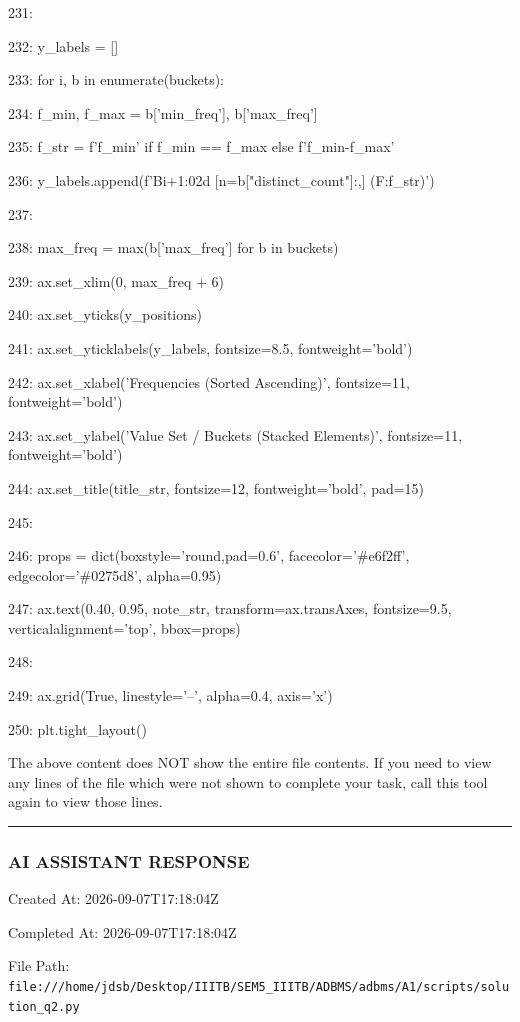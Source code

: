 \documentclass[11pt,a4paper]{article}
\begin{document}
231:

232:     y\_labels = []

233:     for i, b in enumerate(buckets):

234:         f\_min, f\_max = b['min\_freq'], b['max\_freq']

235:         f\_str = f'{f\_min}' if f\_min == f\_max else f'{f\_min}-{f\_max}'

236:         y\_labels.append(f'B{i+1:02d} [n={b["distinct\_count"]:,}] (F:{f\_str})')

237:

238:     max\_freq = max(b['max\_freq'] for b in buckets)

239:     ax.set\_xlim(0, max\_freq + 6)

240:     ax.set\_yticks(y\_positions)

241:     ax.set\_yticklabels(y\_labels, fontsize=8.5, fontweight='bold')

242:     ax.set\_xlabel('Frequencies (Sorted Ascending)', fontsize=11, fontweight='bold')

243:     ax.set\_ylabel('Value Set / Buckets (Stacked Elements)', fontsize=11, fontweight='bold')

244:     ax.set\_title(title\_str, fontsize=12, fontweight='bold', pad=15)

245:

246:     props = dict(boxstyle='round,pad=0.6', facecolor='\#e6f2ff', edgecolor='\#0275d8', alpha=0.95)

247:     ax.text(0.40, 0.95, note\_str, transform=ax.transAxes, fontsize=9.5, verticalalignment='top', bbox=props)

248:

249:     ax.grid(True, linestyle='--', alpha=0.4, axis='x')

250:     plt.tight\_layout()

The above content does NOT show the entire file contents. If you need to view any lines of the file which were not shown to complete your task, call this tool again to view those lines.


\hrule

\subsubsection{AI ASSISTANT RESPONSE}

Created At: 2026-09-07T17:18:04Z

Completed At: 2026-09-07T17:18:04Z

File Path: \texttt{file:///home/jdsb/Desktop/IIITB/SEM5\_IIITB/ADBMS/adbms/A1/scripts/solution\_q2.py}
\end{document}
